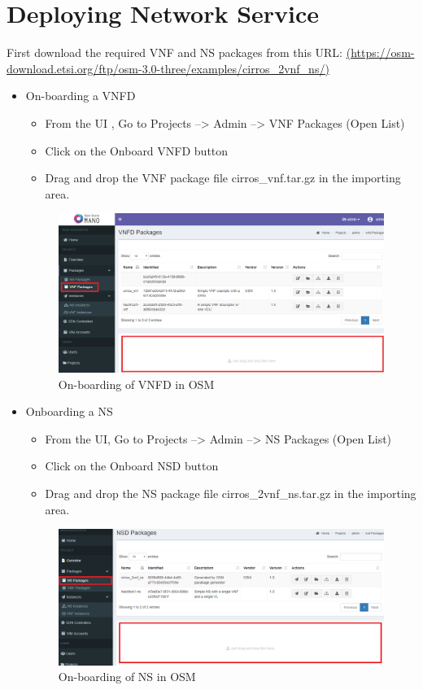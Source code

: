 \section{Deploying Network Service}
First download the required VNF and NS packages from this URL: \hyperlink{name}{(https://osm-download.etsi.org/ftp/osm-3.0-three/examples/cirros\_2vnf\_ns/)}
\begin{itemize}
\item On-boarding a VNFD
\begin{itemize}
\item From the UI , Go to Projects --> Admin --> VNF Packages (Open List)
\item Click on the Onboard VNFD button
\item Drag and drop the VNF package file cirros\_vnf.tar.gz in the importing area.
\end{itemize}
\begin{figure} [H]
	\centering
	\includegraphics[width=0.5\linewidth]{figures/sh4}
	\caption{On-boarding of VNFD in OSM}
\end{figure}

\item Onboarding a NS
\begin{itemize}
\item From the UI, Go to Projects --> Admin --> NS Packages (Open List)
\item Click on the Onboard NSD button
\item Drag and drop the NS package file cirros\_2vnf\_ns.tar.gz in the importing area.
\end{itemize}
\begin{figure} [H]
	\centering
	\includegraphics[width=0.5\linewidth]{figures/sh3}
	\caption{On-boarding of NS in OSM}
\end{figure}



\end{itemize}
